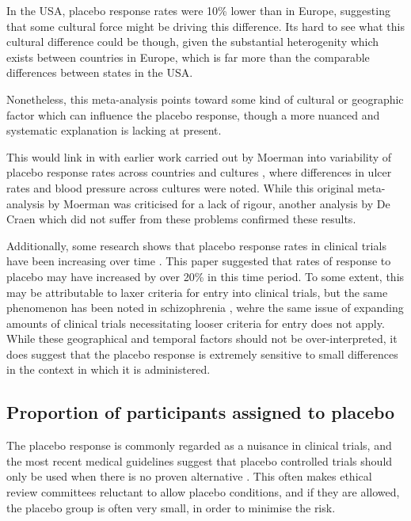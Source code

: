 In the USA, placebo response rates were 10\% lower than in Europe, suggesting that some cultural force might be driving this difference. Its hard to see what this cultural difference could be though, given the substantial heterogenity which exists between countries in Europe, which is far more than the comparable differences between states in the USA. 

Nonetheless, this meta-analysis points toward some kind of cultural or geographic factor which can influence the placebo response, though a more nuanced and systematic explanation is lacking at present. 

This would link in with earlier work carried out by Moerman into variability of placebo response rates across countries and cultures \cite{Moerman2000}, where differences in ulcer rates and blood pressure across cultures were noted. While this original meta-analysis by Moerman was criticised for a lack of rigour, another analysis by  De Craen which did not suffer from these problems \cite{Craen1999a} confirmed these results. 

Additionally, some research shows that placebo response rates in clinical trials have been increasing over time \cite{Enck2005a}. This paper suggested that rates of response to placebo may have increased by over 20\% in this time period. To some extent, this may be attributable to laxer criteria for entry into clinical trials, but the same phenomenon has been noted in schizophrenia \cite{Ravi2008}, wehre the same issue of expanding amounts of clinical trials necessitating looser criteria for entry does not apply. While these geographical and temporal factors should not be over-interpreted, it does suggest that the placebo response is extremely sensitive to small differences in the context in which it is administered. 

\subsection{Proportion of participants assigned to placebo}
\label{sec:effects-clin-trial}

The placebo response is commonly regarded as a nuisance in clinical trials, and the most recent medical guidelines suggest that placebo controlled trials should only be used when there is no proven alternative \cite{temple2000placebo}. This often makes ethical review committees reluctant to allow placebo conditions, and if they are allowed, the placebo group is often very small, in order to minimise the risk. 

